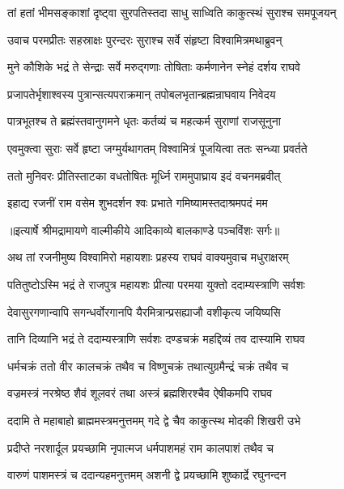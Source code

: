 \twolineshloka
{तां हतां भीमसङ्काशां दृष्ट्वा सुरपतिस्तदा}
{साधु साध्विति काकुत्स्थं सुराश्च समपूजयन्} %

\twolineshloka
{उवाच परमप्रीतः सहस्राक्षः पुरन्दरः}
{सुराश्च सर्वे संहृष्टा विश्वामित्रमथाब्रुवन्} %

\twolineshloka
{मुने कौशिके भद्रं ते सेन्द्राः सर्वे मरुद्गणाः}
{तोषिताः कर्मणानेन स्नेहं दर्शय राघवे} %

\twolineshloka
{प्रजापतेर्भृशाश्वस्य पुत्रान्सत्यपराक्रमान्}
{तपोबलभृतान्ब्रह्मन्राघवाय निवेदय} %

\twolineshloka
{पात्रभूतश्च ते ब्रह्मंस्तवानुगमने धृतः}
{कर्तव्यं च महत्कर्म सुराणां राजसूनुना} %

\twolineshloka
{एवमुक्त्वा सुराः सर्वे हृष्टा जग्मुर्यथागतम्}
{विश्वामित्रं पूजयित्वा ततः सन्ध्या प्रवर्तते} %

\twolineshloka
{ततो मुनिवरः प्रीतिस्ताटका वधतोषितः}
{मूर्ध्नि राममुपाघ्राय इदं वचनमब्रवीत्} %

\twolineshloka
{इहाद्य रजनीं राम वसेम शुभदर्शन}
{श्वः प्रभाते गमिष्यामस्तदाश्रमपदं मम} %


{॥इत्यार्षे श्रीमद्रामायणे वाल्मीकीये आदिकाव्ये बालकाण्डे पञ्चविंशः सर्गः॥}


\twolineshloka
{अथ तां रजनीमुष्य विश्वामिरो महायशाः}
{प्रहस्य राघवं वाक्यमुवाच मधुराक्षरम्} %

\twolineshloka
{पतितुष्टोऽस्मि भद्रं ते राजपुत्र महायशः}
{प्रीत्या परमया युक्तो ददाम्यस्त्राणि सर्वशः} %

\twolineshloka
{देवासुरगणान्वापि सगन्धर्वोरगानपि}
{यैरमित्रान्प्रसह्याजौ वशीकृत्य जयिष्यसि} %

\twolineshloka
{तानि दिव्यानि भद्रं ते ददाम्यस्त्राणि सर्वशः}
{दण्डचक्रं महद्दिव्यं तव दास्यामि राघव} %

\twolineshloka
{धर्मचक्रं ततो वीर कालचक्रं तथैव च}
{विष्णुचक्रं तथात्युग्रमैन्द्रं चक्रं तथैव च} %

\twolineshloka
{वज्रमस्त्रं नरश्रेष्ठ शैवं शूलवरं तथा}
{अस्त्रं ब्रह्मशिरश्चैव ऐषीकमपि राघव} %

\twolineshloka
{ददामि ते महाबाहो ब्राह्ममस्त्रमनुत्तमम्}
{गदे द्वे चैव काकुत्स्थ मोदकी शिखरी उभे} %

\twolineshloka
{प्रदीप्ते नरशार्दूल प्रयच्छामि नृपात्मज}
{धर्मपाशमहं राम कालपाशं तथैव च} %

\twolineshloka
{वारुणं पाशमस्त्रं च ददान्यहमनुत्तमम्}
{अशनी द्वे प्रयच्छामि शुष्कार्द्रे रघुनन्दन} %

